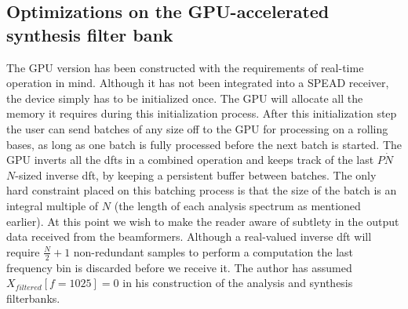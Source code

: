 \documentclass[a4paper,10pt]{article}
\begin{document}
\subsection{Optimizations on the GPU-accelerated synthesis filter bank}
The GPU version has been constructed with the requirements of real-time operation in mind. Although it has not been integrated into a SPEAD receiver, the device simply has
to be initialized once. The GPU will allocate all the memory it requires during this initialization process. After this initialization step the user can send batches of any size 
off to the GPU for processing on a rolling bases, as long as one batch is fully processed before the next batch is started. The GPU inverts all the \gls{dft}s in a combined operation  
and keeps track of the last $P\dot N$ $N$-sized inverse \gls{dft}, by keeping a persistent buffer between batches. The only hard constraint placed on this batching process is that 
the size of the batch is an integral multiple of $N$ (the length of each analysis spectrum as mentioned earlier). At this point we wish to make the reader aware of subtlety in the 
output data received from the beamformers. Although a real-valued inverse \gls{dft} will require $\frac{N}{2}+1$ non-redundant samples to perform a computation the last frequency bin 
is discarded before we receive it. The author has assumed $X_{filtered}[f=1025] = 0$ in his construction of the analysis and synthesis filterbanks.
\end{document}
